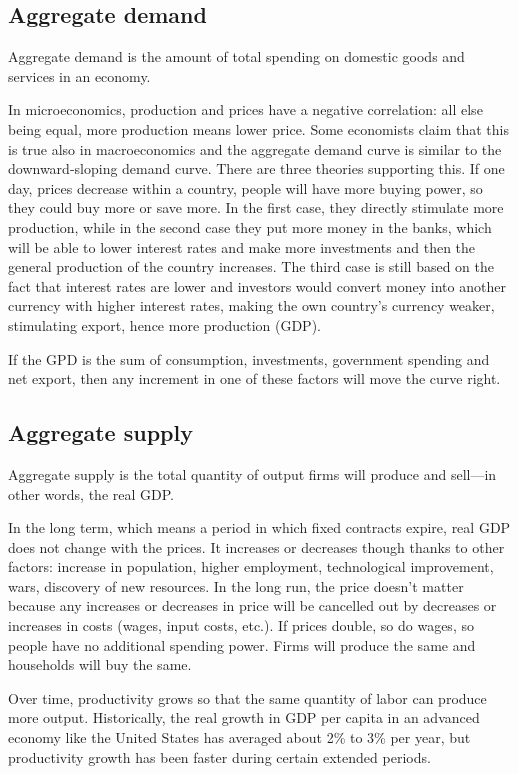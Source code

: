\subsection{Aggregate demand}
Aggregate demand is the amount of total spending on domestic goods and services in an economy.

In microeconomics, production and prices have a negative correlation: all else being equal, more production means lower price. Some economists claim that this is true also in macroeconomics and the aggregate demand curve is similar to the downward-sloping demand curve. There are three theories supporting this. If one day, prices decrease within a country, people will have more buying power, so they could buy more or save more. In the first case, they directly stimulate more production, while in the second case they put more money in the banks, which will be able to lower interest rates and make more investments and then the general production of the country increases. The third case is still based on the fact that interest rates are lower and investors would convert money into another currency with higher interest rates, making the own country's currency weaker, stimulating export, hence more production (GDP).

If the GPD is the sum of consumption, investments, government spending and net export, then any increment in one of these factors will move the curve right.

\subsection{Aggregate supply}
Aggregate supply is the total quantity of output firms will produce and sell—in other words, the real GDP. 

In the long term, which means a period in which fixed contracts expire, real GDP does not change with the prices. It increases or decreases though thanks to other factors: increase in population, higher employment, technological 
improvement, wars, discovery of new resources. In the long run, the price doesn't matter because any increases or decreases in price will be cancelled out by decreases or increases in costs (wages, input costs, etc.). If prices double, so do wages, so people have no additional spending power. Firms will produce the same and households will buy the same.

Over time, productivity grows so that the same quantity of labor can produce more output. Historically, the real growth in GDP per capita in an advanced economy like the United States has averaged about 2\% to 3\% per year, but productivity growth has been faster during certain extended periods.

